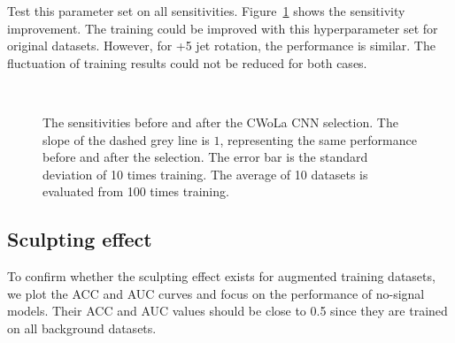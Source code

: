\documentclass[12pt]{article}
\begin{document}
		Test this parameter set on all sensitivities. Figure~\ref{fig:sensitivity_improvement_best_hp_res_25} shows the sensitivity improvement. The training could be improved with this hyperparameter set for original datasets. However, for +5 jet rotation, the performance is similar. The fluctuation of training results could not be reduced for both cases.
		\begin{figure}[htpb]
			\centering
			 \\
			\caption{The sensitivities before and after the CWoLa CNN selection. The slope of the dashed grey line is $1$, representing the same performance before and after the selection. The error bar is the standard deviation of 10 times training. The average of 10 datasets is evaluated from 100 times training.}
			\label{fig:sensitivity_improvement_best_hp_res_25}
		\end{figure}
	\subsection{Sculpting effect}%
	\label{sub:sculpting_effect}
		To confirm whether the sculpting effect exists for augmented training datasets, we plot the ACC and AUC curves and focus on the performance of no-signal models. Their ACC and AUC values should be close to 0.5 since they are trained on all background datasets.
\end{document}
